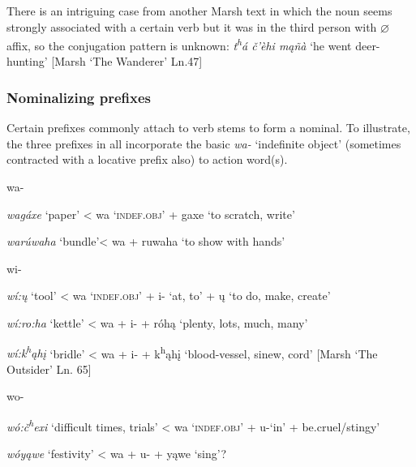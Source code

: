 \documentclass[output=paper]{LSP/langsci}
\begin{document}
There is an intriguing case from another Marsh text in which the noun seems strongly associated with a certain verb but it was in the third person with $\varnothing$ affix, so the conjugation pattern is unknown: \textit{t\textsuperscript{h}\'a \v{c}'\`ehi m\k{a}\~n\`a} `he went deer-hunting' [Marsh `The Wanderer' Ln.47]  

\subsubsection{Nominalizing prefixes} 
Certain prefixes commonly attach to verb stems to form a nominal.  To illustrate, the three prefixes in  all incorporate the basic \textit{wa-} `indefinite object' (sometimes contracted with a locative prefix also) to action word(s).

\begin{exe}
\ex \label{wawiwo}
\begin{xlist}
\ex wa-     	       											
	       	
\textit{wag\'axe}       `paper'  < wa `\textsc{indef.obj}' + gaxe `to scratch, write'
		
\textit{war\'uwaha}  `bundle'< wa  + ruwaha `to show with hands'
            
\ex wi-															

\textit{w\'i:\k{u}}    `tool'    < wa `\textsc{indef.obj}' + i- `at, to' + \k{u} `to do, make, create'
            
\textit{w\'i:ro:ha}  `kettle' < wa + i-  + r\'oh\k{a} `plenty, lots, much, many'

\textit{w\'i:k\textsuperscript{h}\k{a}h\k{i}} `bridle'  < wa + i-  + k\textsuperscript{h}\k{a}h\k{i} `blood-vessel, sinew, cord'   [Marsh `The Outsider' Ln. 65]\footnotemark

\ex wo-  															

\textit{w\'o:\v{c}\textsuperscript{h}exi}   `difficult times, trials' < wa `\textsc{indef.obj}' + u-`in' + be.cruel/stingy'
	
\textit{w\'oy\k{a}we}  `festivity' < wa + u- + y\k{a}we `sing'? \footnotemark
\end{xlist}
\end{exe}
\end{document}
